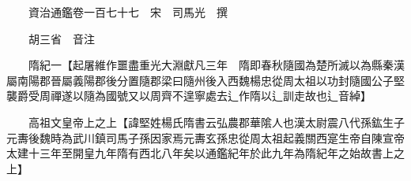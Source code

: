 










 


 
 


 

  
  
  
  
  





  
  
  
  
  
 
  

  

  
  
  



  

 
 

  
   




  

  
  


  　　資治通鑑卷一百七十七　宋　司馬光　撰

　　胡三省　音注

　　隋紀一【起屠維作噩盡重光大淵獻凡三年　隋即春秋隨國為楚所滅以為縣秦漢屬南陽郡晉屬義陽郡後分置隨郡梁曰隨州後入西魏楊忠從周太祖以功封隨國公子堅襲爵受周禪遂以隨為國號又以周齊不遑寧處去辶作隋以辶訓走故也辶音綽】

　　高祖文皇帝上之上【諱堅姓楊氏隋書云弘農郡華隂人也漢太尉震八代孫鈜生子元夀後魏時為武川鎮司馬子孫因家焉元夀玄孫忠從周太祖起義關西寔生帝自陳宣帝太建十三年至開皇九年隋有西北八年矣以通鑑紀年於此九年為隋紀年之始故書上之上】

